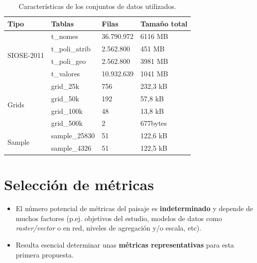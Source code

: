 \begin{table}[]
\centering
\caption{Características de los conjuntos de datos utilizados. \label{tab:datos}}
\begin{tabular}{@{}llll@{}}
\toprule
\textbf{Tipo}               & \textbf{Tablas} & \textbf{Filas} & \textbf{Tamaño total} \\ \midrule
\multirow{4}{*}{SIOSE-2011} & t\_nomes        & 36.790.972     & 6116 MB               \\
                            & t\_poli\_atrib  & 2.562.800      & 451 MB                \\
                            & t\_poli\_geo    & 2.562.800      & 3981 MB               \\
                            & t\_valores      & 10.932.639     & 1041 MB               \\ \midrule
\multirow{4}{*}{Grids}      & grid\_25k       & 756            & 232,3 kB              \\
                            & grid\_50k       & 192            & 57,8 kB               \\
                            & grid\_100k      & 48             & 13,8 kB               \\
                            & grid\_500k      & 2              & 677bytes              \\ \midrule
\multirow{2}{*}{Sample}     & sample\_25830   & 51             & 122,6 kB              \\
                            & sample\_4326    & 51             & 122,5 kB              \\ \bottomrule
\end{tabular}
\end{table}


\section{Selección de métricas}\label{sec:metricas}

\begin{graybox}
\begin{itemize}
\item El número potencial de métricas del paisaje es \textbf{indeterminado} y depende de muchos factores (p.ej. objetivos del estudio, modelos de datos como \textit{raster/vector} o en red, niveles de agregación y/o escala, etc).
\item Resulta esencial determinar unas \textbf{métricas representativas} para esta primera propuesta.
\end{itemize}
\end{graybox}

